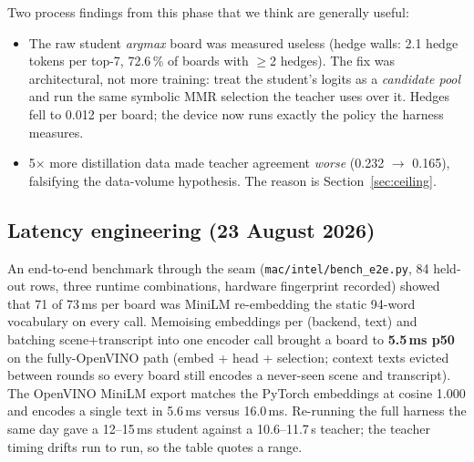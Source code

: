 \documentclass[11pt]{article}
\newcommand{\file}[1]{\texttt{\small #1}}
\begin{document}
Two process findings from this phase that we think are generally useful:
\begin{itemize}
\item The raw student \emph{argmax} board was measured useless (hedge walls: 2.1 hedge tokens per top-7, 72.6\,\% of boards with $\ge$2 hedges). The fix was architectural, not more training: treat the student's logits as a \emph{candidate pool} and run the same symbolic MMR selection the teacher uses over it. Hedges fell to 0.012 per board; the device now runs exactly the policy the harness measures.
\item 5$\times$ more distillation data made teacher agreement \emph{worse} (0.232 $\to$ 0.165), falsifying the data-volume hypothesis. The reason is Section~\ref{sec:ceiling}.
\end{itemize}

\subsection{Latency engineering (23 August 2026)}
An end-to-end benchmark through the seam (\file{mac/intel/bench\_e2e.py}, 84
held-out rows, three runtime combinations, hardware fingerprint recorded)
showed that 71 of 73\,ms per board was MiniLM re-embedding the static 94-word
vocabulary on every call. Memoising embeddings per (backend, text) and batching
scene+transcript into one encoder call brought a board to \textbf{5.5\,ms p50}
on the fully-OpenVINO path (embed + head + selection; context texts evicted
between rounds so every board still encodes a never-seen scene and
transcript). The OpenVINO MiniLM export matches the PyTorch embeddings at cosine
1.000 and encodes a single text in 5.6\,ms versus 16.0\,ms. Re-running the full harness the same day gave a 12--15\,ms student against a 10.6--11.7\,s teacher; the teacher timing drifts run to run, so the table quotes a range.

\end{document}
